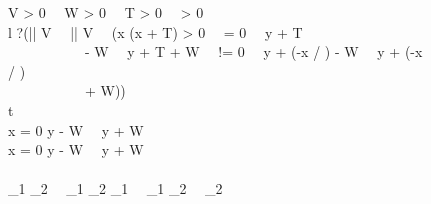 \begin{figure}[p]
\begin{center}
\begin{sllisting}
\Init \Equiv V > 0 \, \land \, W > 0 \, \land \, T > 0 \, \land \, \sigma > 0\\
\Ctrl \Equiv \rcvx \dlassign * \seq \rcvy \dlassign * \seq l \dlassign * \seq ?(|\rcvx| \le V \, \land \, |\rcvy| \le V \, \land \, (x (x + \rcvx T) > 0 \, \lor \, \rcvx = 0 \, \land \, y + \rcvy T \ge\\
  \slind \, \, \, \, \, \, \, \, \, \, \,  \rcybmax - W \, \land \, y + \rcvy T \le \rcybmin + W \, \lor \, !\rcvx = 0 \, \land \, y + \rcvy (-x / \rcvx) \ge \rcybmax - W \, \land \, y + \rcvy (-x / \rcvx) \le \\
  \slind \, \, \, \, \, \, \, \, \, \, \, \rcybmin + W))\\
\Plant \Equiv t  \seq {}\\
\Inv \Equiv x = 0 \limply y \ge \rcybmax - W \, \land \, y \le \rcybmin + W\\
\Safe \Equiv x = 0 \limply y \ge \rcyb - W \, \land \, y \le \rcyb + W\\
\pbmonotonicity\\
  \hspace{0.5em}\text{--}\hspace{0.4em}{\rcybmax}_1 \le {\rcybmax}_2 \, \land \, {\rcybmin}_1 \ge {\rcybmin}_2 \limply \rcyb \le {\rcybmax}_1 \, \land \, \rcyb \ge {\rcybmin}_1 \limply \rcyb \le {\rcybmax}_2 \, \land \, \rcyb \ge {\rcybmin}_2\\
\pbmodel\\
  \hspace{0.5em}\text{--}\hspace{0.4em}\Init \, \land \, \rcyb \le \rcybmax \, \land \, \rcyb \ge \rcybmin \, \land \, \Inv \limply \lboxI{\Ctrl \seq \Plant}\Inv\\
\pbsafe\\
  \hspace{0.5em}\text{--}\hspace{0.4em}\Init \, \land \, \rcyb \le \rcybmax \, \land \, \rcyb \ge \rcybmin \, \land \, \Inv \limply \Safe\\
\pbtotality\\
  \hspace{0.5em}\text{--}\hspace{0.4em}\Init \, \land \, \rcyb \le \rcybmax \, \land \, \rcyb \ge \rcybmin \, \land \, \Inv \limply \ldiamond{\Ctrl}{\True}\\

\end{sllisting}
\end{center}
\end{figure}

